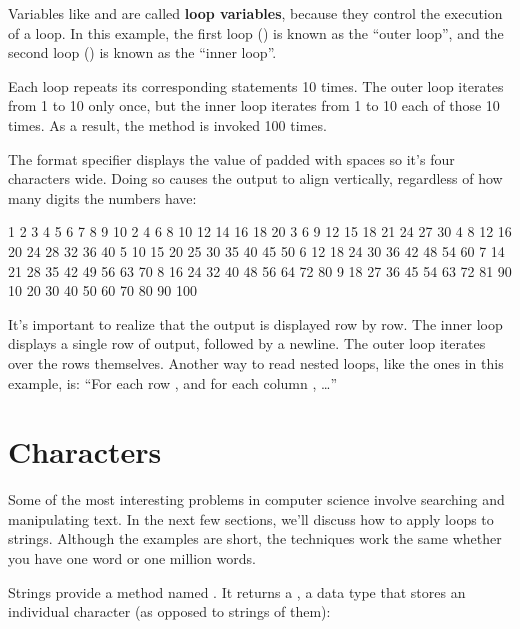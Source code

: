 
Variables like  and  are called {\bf loop variables}, because they control the execution of a loop.
In this example, the first loop () is known as the ``outer loop'', and the second loop () is known as the ``inner loop''.

Each loop repeats its corresponding statements 10 times.
The outer loop iterates from 1 to 10 only once, but the inner loop iterates from 1 to 10 each of those 10 times.
As a result, the  method is invoked 100 times.


The format specifier  displays the value of  padded with spaces so it's four characters wide.
Doing so causes the output to align vertically, regardless of how many digits the numbers have:

\begin{stdout}
   1   2   3   4   5   6   7   8   9  10
   2   4   6   8  10  12  14  16  18  20
   3   6   9  12  15  18  21  24  27  30
   4   8  12  16  20  24  28  32  36  40
   5  10  15  20  25  30  35  40  45  50
   6  12  18  24  30  36  42  48  54  60
   7  14  21  28  35  42  49  56  63  70
   8  16  24  32  40  48  56  64  72  80
   9  18  27  36  45  54  63  72  81  90
  10  20  30  40  50  60  70  80  90 100
\end{stdout}

It's important to realize that the output is displayed row by row.
The inner loop displays a single row of output, followed by a newline.
The outer loop iterates over the rows themselves.
Another way to read nested loops, like the ones in this example, is: ``For each row , and for each column , \ldots''


\section{Characters}

Some of the most interesting problems in computer science involve searching and manipulating text.
In the next few sections, we'll discuss how to apply loops to strings.
Although the examples are short, the techniques work the same whether you have one word or one million words.


Strings provide a method named .
It returns a , a data type that stores an individual character (as opposed to strings of them):

